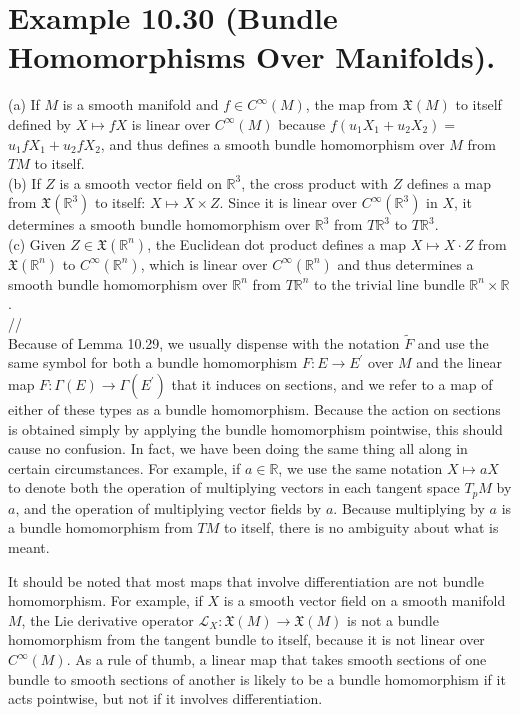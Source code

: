 \documentclass[10pt, letterpaper]{article}
\begin{document}
\section*{Example 10.30 (Bundle Homomorphisms Over Manifolds).}
(a) If $M$ is a smooth manifold and $f \in C^{\infty}(M)$, the map from $\mathfrak{X}(M)$ to itself defined by $X \mapsto f X$ is linear over $C^{\infty}(M)$ because $f\left(u_{1} X_{1}+u_{2} X_{2}\right)=$ $u_{1} f X_{1}+u_{2} f X_{2}$, and thus defines a smooth bundle homomorphism over $M$ from $T M$ to itself.\\
(b) If $Z$ is a smooth vector field on $\mathbb{R}^{3}$, the cross product with $Z$ defines a map from $\mathfrak{X}\left(\mathbb{R}^{3}\right)$ to itself: $X \mapsto X \times Z$. Since it is linear over $C^{\infty}\left(\mathbb{R}^{3}\right)$ in $X$, it determines a smooth bundle homomorphism over $\mathbb{R}^{3}$ from $T \mathbb{R}^{3}$ to $T \mathbb{R}^{3}$.\\
(c) Given $Z \in \mathfrak{X}\left(\mathbb{R}^{n}\right)$, the Euclidean dot product defines a map $X \mapsto X \cdot Z$ from $\mathfrak{X}\left(\mathbb{R}^{n}\right)$ to $C^{\infty}\left(\mathbb{R}^{n}\right)$, which is linear over $C^{\infty}\left(\mathbb{R}^{n}\right)$ and thus determines a smooth bundle homomorphism over $\mathbb{R}^{n}$ from $T \mathbb{R}^{n}$ to the trivial line bundle $\mathbb{R}^{n} \times \mathbb{R}$.\\
//\\
Because of Lemma 10.29, we usually dispense with the notation $\widetilde{F}$ and use the same symbol for both a bundle homomorphism $F: E \rightarrow E^{\prime}$ over $M$ and the linear map $F: \Gamma(E) \rightarrow \Gamma\left(E^{\prime}\right)$ that it induces on sections, and we refer to a map of either of these types as a bundle homomorphism. Because the action on sections is obtained simply by applying the bundle homomorphism pointwise, this should cause no confusion. In fact, we have been doing the same thing all along in certain circumstances. For example, if $a \in \mathbb{R}$, we use the same notation $X \mapsto a X$ to denote both the operation of multiplying vectors in each tangent space $T_{p} M$ by $a$, and the operation of multiplying vector fields by $a$. Because multiplying by $a$ is a bundle homomorphism from $T M$ to itself, there is no ambiguity about what is meant.

It should be noted that most maps that involve differentiation are not bundle homomorphism. For example, if $X$ is a smooth vector field on a smooth manifold $M$, the Lie derivative operator $\mathscr{L}_{X}: \mathfrak{X}(M) \rightarrow \mathfrak{X}(M)$ is not a bundle homomorphism from the tangent bundle to itself, because it is not linear over $C^{\infty}(M)$. As a rule of thumb, a linear map that takes smooth sections of one bundle to smooth sections of another is likely to be a bundle homomorphism if it acts pointwise, but not if it involves differentiation.
\end{document}

